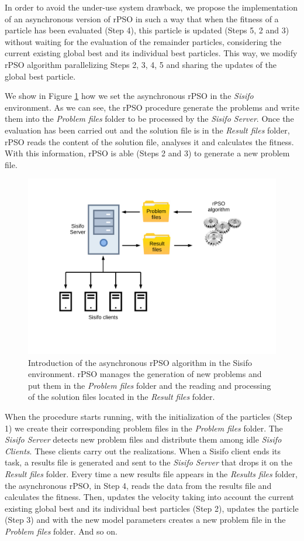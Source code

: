 In order to avoid the under-use system drawback, we propose the implementation of an asynchronous version of rPSO in such a way that when the fitness of a particle has been evaluated (Step 4), this particle is updated (Steps 5, 2 and 3) without waiting for the evaluation of the remainder particles, considering the current existing global best and its individual best particles. This way, we modify rPSO algorithm parallelizing Steps 2, 3, 4, 5 and sharing the updates of the global best particle.

We show in Figure \ref{rPSO.python} how we set the asynchronous rPSO in the \textit{Sisifo} environment. As we can see, the rPSO procedure generate the problems and write them into the \textit{Problem files} folder to be processed by the \textit{Sisifo Server}. Once the evaluation has been carried out and the solution file is in the \textit{Result  files} folder, rPSO reads the content of the solution file, analyses it and calculates the fitness. With this information, rPSO is able (Steps 2 and 3) to generate a new problem file. 

\begin{figure}[h!]
	\centering
	\includegraphics[width=0.6\linewidth]{IMGs/1.-Calibrado/Esquema_2.pdf}
	\caption{Introduction of the asynchronous rPSO algorithm in the Sisifo environment. rPSO manages the generation of new problems and put them in the \textit{Problem files} folder and the reading and processing of the solution files located in the \textit{Result  files} folder.}
	\label{rPSO.python}
\end{figure}

When the procedure starts running, with the initialization of the particles (Step 1) we create their corresponding problem files in the \textit{Problem files} folder. The \textit{Sisifo Server} detects new problem files and distribute them among idle \textit{Sisifo Clients}. These clients carry out the realizations. When a Sisifo client ends its task, a results file is generated and sent to the \textit{Sisifo Server} that drops it on the \textit{Result files} folder. Every time a new results file appears in the \textit{Results files} folder, the asynchronous rPSO, in Step 4, reads the data from the results file and calculates the fitness. Then, updates the velocity taking into account the current existing global best and its individual best particles (Step 2), updates the particle (Step 3) and with the new model parameters creates a new problem file in the \textit{Problem files} folder. And so on. 

